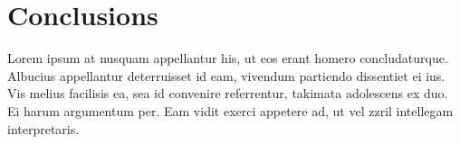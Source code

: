 {}

\chapter*{Conclusions}

Lorem ipsum at nusquam appellantur his, ut eos erant homero
concludaturque. Albucius appellantur deterruisset id eam, vivendum
partiendo dissentiet ei ius. Vis melius facilisis ea, sea id convenire
referrentur, takimata adolescens ex duo. Ei harum argumentum per. Eam
vidit exerci appetere ad, ut vel zzril intellegam interpretaris.
